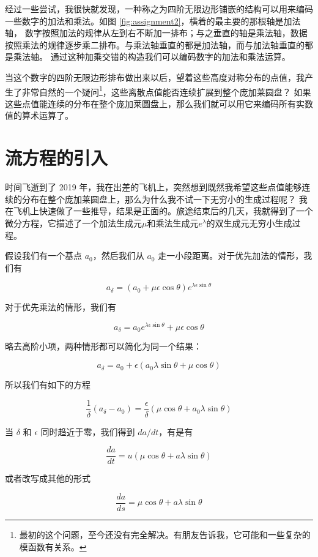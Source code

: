 \documentclass[a4paper,12pt]{book}
\numberwithin{problem}{section}
\numberwithin{definition}{section}
\numberwithin{lemma}{section}
\numberwithin{proposition}{section}
\numberwithin{theorem}{section}
\numberwithin{grammar}{section}
\numberwithin{program}{section}
\numberwithin{convention}{section}
\numberwithin{corollary}{section}
\begin{document}
经过一些尝试，我很快就发现，一种称之为四阶无限边形铺嵌的结构可以用来编码一些数字的加法和乘法。如图 \ref{fig:assignment2}，横着的最主要的那根轴是加法轴，
数字按照加法的规律从左到右不断加一排布；与之垂直的轴是乘法轴，数据按照乘法的规律逐步乘二排布。与乘法轴垂直的都是加法轴，而与加法轴垂直的都是乘法轴。
通过这种加乘交错的构造我们可以编码数字的加法和乘法运算。

当这个数字的四阶无限边形排布做出来以后，望着这些高度对称分布的点值，我产生了非常自然的一个疑问\footnote{最初的这个问题，至今还没有完全解决。有朋友告诉我，它可能和一些复杂的模函数有关系。}，这些离散点值能否连续扩展到整个庞加莱圆盘？
如果这些点值能连续的分布在整个庞加莱圆盘上，那么我们就可以用它来编码所有实数值的算术运算了。

\section{流方程的引入}

时间飞逝到了 2019 年，我在出差的飞机上，突然想到既然我希望这些点值能够连续的分布在整个庞加莱圆盘上，那么为什么我不试一下无穷小的生成过程呢？
我在飞机上快速做了一些推导，结果是正面的。旅途结束后的几天，我就得到了一个微分方程，它描述了一个加法生成元$\mu$和乘法生成元$e^\lambda$的双生成元无穷小生成过程。

假设我们有一个基点 $a_0$，然后我们从 $a_0$ 走一小段距离。对于优先加法的情形，我们有

\[
a_{\delta} = (a_0 + \mu \epsilon \cos \theta)e^{\lambda \epsilon \sin \theta}
\]

对于优先乘法的情形，我们有

\[
a_{\delta} = a_0 e^{\lambda \epsilon \sin \theta} + \mu \epsilon \cos \theta
\]

略去高阶小项，两种情形都可以简化为同一个结果：

\[
a_{\delta} = a_0 + \epsilon (a_0 \lambda \sin \theta + \mu \cos \theta)
\]

所以我们有如下的方程

\[
\frac{1}{\delta} (a_{\delta} - a_0) = \frac{\epsilon}{\delta} (\mu \cos \theta + a_0 \lambda \sin \theta)
\]

当 $\delta$ 和 $\epsilon$ 同时趋近于零，我们得到 $da / dt$，有是有

\[
\frac{da}{dt} = u (\mu \cos \theta + a \lambda \sin \theta)
\]

或者改写成其他的形式

\begin{equation}
\frac{da}{ds} = \mu \cos \theta + a \lambda \sin \theta\label{eq:flow}
\end{equation}
\end{document}
